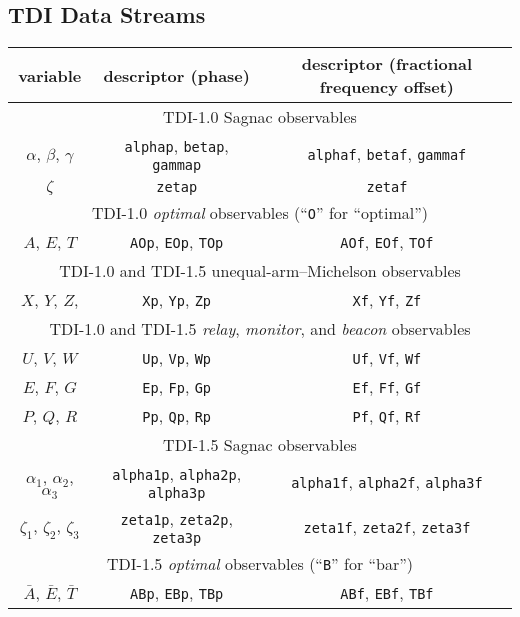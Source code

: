 \documentclass[11pt]{report}
\begin{document}
\subsection{TDI Data Streams}

\begin{center}
\begin{tabular}{c|c|c}
\hline \hline
variable & descriptor (phase) & descriptor (fractional frequency offset) \\
\hline
\multicolumn{3}{c}{TDI-1.0 Sagnac observables} \\
$\alpha$, $\beta$, $\gamma$  & \texttt{alphap}, \texttt{betap}, \texttt{gammap} & \texttt{alphaf}, \texttt{betaf}, \texttt{gammaf} \\
$\zeta$  & \texttt{zetap}  & \texttt{zetaf} \\
\hline
\multicolumn{3}{c}{TDI-1.0 \emph{optimal} observables (``\texttt{O}'' for ``optimal'')} \\
$A$, $E$, $T$ & \texttt{AOp}, \texttt{EOp}, \texttt{TOp} & \texttt{AOf}, \texttt{EOf}, \texttt{TOf} \\
\hline
\multicolumn{3}{c}{TDI-1.0 and TDI-1.5 unequal-arm--Michelson observables} \\
$X$, $Y$, $Z$, & \texttt{Xp}, \texttt{Yp}, \texttt{Zp} & \texttt{Xf}, \texttt{Yf}, \texttt{Zf} \\
\hline
\multicolumn{3}{c}{TDI-1.0 and TDI-1.5 \emph{relay}, \emph{monitor}, and \emph{beacon} observables} \\
$U$, $V$, $W$ & \texttt{Up}, \texttt{Vp}, \texttt{Wp} & \texttt{Uf}, \texttt{Vf}, \texttt{Wf} \\
$E$, $F$, $G$ & \texttt{Ep}, \texttt{Fp}, \texttt{Gp} & \texttt{Ef}, \texttt{Ff}, \texttt{Gf} \\
$P$, $Q$, $R$ & \texttt{Pp}, \texttt{Qp}, \texttt{Rp} & \texttt{Pf}, \texttt{Qf}, \texttt{Rf} \\
\hline
\multicolumn{3}{c}{TDI-1.5 Sagnac observables} \\
$\alpha_1$, $\alpha_2$, $\alpha_3$ & \texttt{alpha1p}, \texttt{alpha2p}, \texttt{alpha3p} & \texttt{alpha1f}, \texttt{alpha2f}, \texttt{alpha3f} \\
$\zeta_1$, $\zeta_2$, $\zeta_3$  & \texttt{zeta1p}, \texttt{zeta2p}, \texttt{zeta3p}  & \texttt{zeta1f}, \texttt{zeta2f}, \texttt{zeta3f} \\
\hline
\multicolumn{3}{c}{TDI-1.5 \emph{optimal} observables (``\texttt{B}'' for ``bar'')} \\
$\bar{A}$, $\bar{E}$, $\bar{T}$ & \texttt{ABp}, \texttt{EBp}, \texttt{TBp} & \texttt{ABf}, \texttt{EBf}, \texttt{TBf} \\

\end{tabular}
\end{center}
\end{document}
